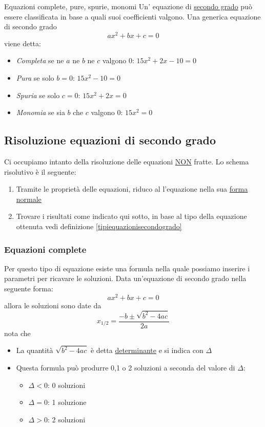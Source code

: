 \begin{definizione}{Equazioni complete, pure, spurie, monomi}
	Un' equazione di \underline{secondo grado} può essere classificata in base a quali suoi coefficienti valgono. Una generica equazione di secondo grado
	\[
		ax^2  + bx + c = 0
	\]
	viene detta:
	\begin{itemize}
		\item \textit{Completa} se ne $ a $ ne $ b $ ne $ c $ valgono 0: $ 15x^2  + 2x -10 = 0  $
		\item \textit{Pura} se solo $ b = 0 $: $ 15x^2  - 10 = 0 $
		\item \textit{Spuria} se solo $ c = 0 $: $ 15x^2 +2x = 0  $
		\item \textit{Monomia} se sia $ b $ che $ c $ valgono 0: $ 15x^2 = 0 $
	\end{itemize}
\end{definizione}\label{tipiequazionisecondogrado}

\subsection{Risoluzione equazioni di secondo grado}
Ci occupiamo intanto della risoluzione delle equazioni \underline{NON} fratte. Lo schema risolutivo è il seguente:
\begin{enumerate}
	\item Tramite le proprietà delle equazioni, riduco al l'equazione nella sua \underline{forma normale}
	\item Trovare i risultati come indicato qui sotto, in base al tipo della equazione ottenuta vedi definizione \ref{tipiequazionisecondogrado}
\end{enumerate}
\subsubsection{Equazioni complete}
Per questo tipo di equazione esiste una formula nella quale possiamo inserire i parametri per ricavare le soluzioni. Data un'equazione di secondo grado nella seguente forma:
\[
	ax^2  + bx + c = 0
\]
allora le soluzioni sono date da
\[
	x_{1/2} = \frac{-b \pm \sqrt{b^2  - 4 ac}}{2a}
\]
nota che
\begin{itemize}
	\item La quantità $ \sqrt{b^2  - 4ac} $ è detta \underline{determinante} e si indica con $ \Delta  $
	\item Questa formula può produrre 0,1 o 2 soluzioni a seconda del valore di $ \Delta  $:
	      \begin{itemize}
		      \item $ \Delta < 0 $: 0 soluzioni
		      \item $ \Delta = 0 $: 1 soluzione
		      \item $ \Delta > 0 $: 2 soluzioni
	      \end{itemize}
\end{itemize}
